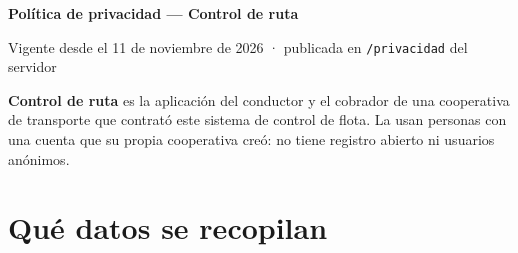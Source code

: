 \documentclass[10.5pt,a4paper]{article}
\begin{document}

{\LARGE\bfseries Política de privacidad — Control de ruta}\par
{\small\color{tenue}Vigente desde el 11 de noviembre de 2026 · publicada en \texttt{/privacidad} del servidor}

\textbf{Control de ruta} es la aplicación del conductor y el cobrador de una
cooperativa de transporte que contrató este sistema de control de flota. La
usan personas con una cuenta que su propia cooperativa creó: no tiene
registro abierto ni usuarios anónimos.

\section{Qué datos se recopilan}
\end{document}
